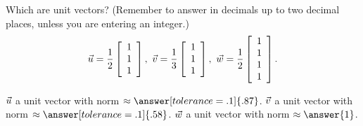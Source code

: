 \documentclass{ximera}
\author{Zack Reed}
\begin{document}
\begin{exercise}

Which are unit vectors? (Remember to answer in decimals up to two decimal places, unless you are entering an integer.)
\begin{equation*}
  \vect{u}=\frac{1}{2}\startmat{c}1\\1\\1\stopmat, \quad
  \vect{v}=\frac{1}{3}\startmat{c}1\\1\\1\stopmat, \quad
  \vect{w}=\frac{1}{2}\startmat{c}1\\1\\1\\1\stopmat.
\end{equation*}

$\vect{u}$  a unit vector with norm $\approx\answer[tolerance=.1]{.87}$. $\vect{v}$  a unit vector with norm $\approx\answer[tolerance=.1]{.58}$. $\vect{w}$  a unit vector with norm $\approx\answer{1}$.

\end{exercise}
\end{document}
